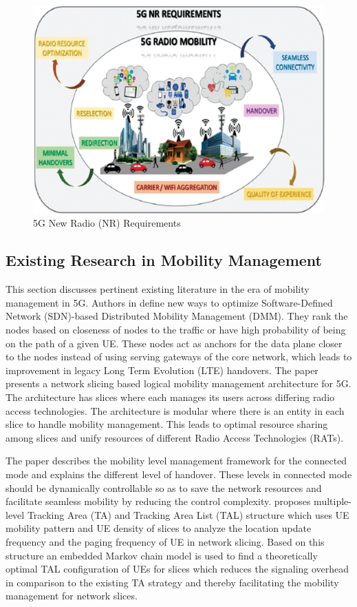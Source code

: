 \begin{multicols}{2}
\begin{figure}[H]
\centering
\includegraphics[scale=.75]{src/Figures/chap1/chap1-fig02.jpg}
\caption{5G New Radio (NR) Requirements }\label{chap1-fig02}
\end{figure}


\subsection{Existing Research in Mobility Management}

This section discusses pertinent existing literature in the era of mobility management in 5G. Authors in \cite{art1-key03} define new ways to optimize Software-Defined Network (SDN)-based Distributed Mobility Management (DMM). They rank the nodes based on closeness of nodes to the traffic or have high probability of being on the path of a given UE. These nodes act as anchors for the data plane closer to the nodes instead of using serving gateways of the core network, which leads to  improvement in legacy Long Term Evolution (LTE) handovers.  The paper \cite{art1-key04} presents a network slicing based logical mobility management architecture for 5G. The architecture has slices where each manages its users across differing radio access technologies. The architecture is modular where there is an entity in each slice to handle mobility management. This leads to optimal resource sharing among slices and unify resources of different Radio Access Technologies (RATs).

The paper \cite{art1-key05} describes the mobility level management framework for the connected mode and explains the different level of handover. These levels in connected mode should be dynamically controllable so as to save the network resources and facilitate seamless mobility by reducing the control complexity.  \cite{art1-key06} proposes multiple-level Tracking Area (TA) and Tracking  Area List (TAL) structure which uses UE mobility pattern  and UE density of slices to analyze the location update  frequency and the paging frequency of UE in network slicing.  Based on this structure an embedded Markov chain model is used to find a theoretically optimal TAL configuration of UEs  for slices which reduces the signaling overhead in comparison  to the existing TA strategy and thereby facilitating the mobility  management for network slices.


\end{multicols}
